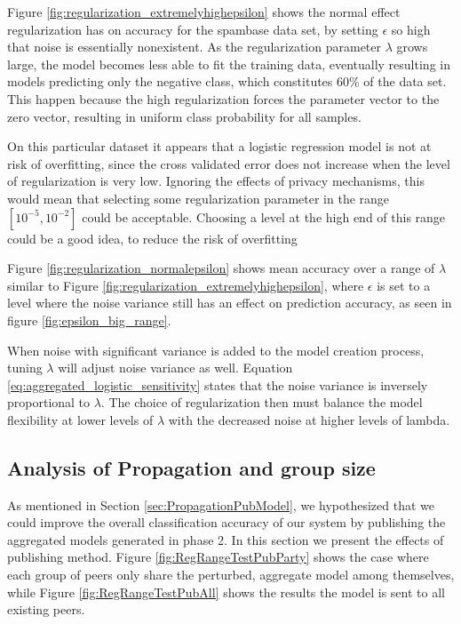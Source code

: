 Figure \ref{fig:regularization_extremelyhighepsilon} shows the normal effect regularization has on accuracy for the spambase data set, by setting $\epsilon$ so high that noise is essentially nonexistent. As the regularization parameter $\lambda$ grows large, the model becomes less able to fit the training data, eventually resulting in models predicting only the negative class, which constitutes 60\% of the data set. This happen because the high regularization forces the parameter vector to the zero vector, resulting in uniform class probability for all samples. 

On this particular dataset it appears that a logistic regression model is not at risk of overfitting, since the cross validated error does not increase when the level of regularization is very low. Ignoring the effects of privacy mechanisms, this would mean that selecting some regularization parameter in the range $[10^{-5},10^{-2}]$ could be acceptable. Choosing a level at the high end of this range could be a good idea, to reduce the risk of overfitting

Figure \ref{fig:regularization_normalepsilon} shows mean accuracy over a range of $\lambda$ similar to Figure \ref{fig:regularization_extremelyhighepsilon}, where $\epsilon$ is set to a level where the noise variance still has an effect on prediction accuracy, as seen in figure \ref{fig:epsilon_big_range}.

When noise with significant variance is added to the model creation process, tuning $\lambda$ will adjust noise variance as well. Equation \ref{eq:aggregated_logistic_sensitivity} states that the noise variance is inversely proportional to $\lambda$. The choice of regularization then must balance the model flexibility at lower levels of $\lambda$ with the decreased noise at higher levels of lambda.


\subsection{Analysis of Propagation and group size}

As mentioned in Section \ref{sec:PropagationPubModel}, we hypothesized that we could improve the overall classification accuracy of our system by publishing the aggregated models generated in phase 2. In this section we present the effects of publishing method. Figure \ref{fig:RegRangeTestPubParty} shows the case where each group of peers only share the perturbed, aggregate model among themselves, while Figure \ref{fig:RegRangeTestPubAll} shows the results the model is sent to all existing peers. 

